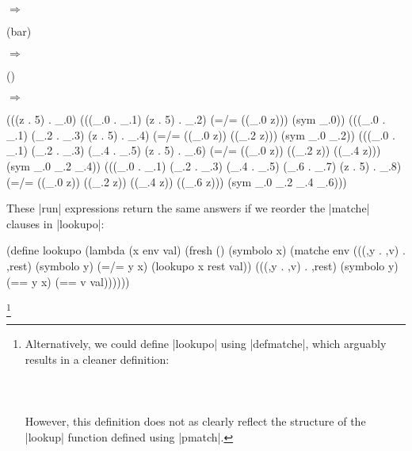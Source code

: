 \noindent{} $\Rightarrow$
\begin{schemeresponsebox}(bar)\end{schemeresponsebox}

\noindent{} $\Rightarrow$
\begin{schemeresponsebox}()\end{schemeresponsebox}

\noindent{}

$\Rightarrow$

\begin{schemeresponsebox}
(((z . 5) . _.0)
 (((_.0 . _.1) (z . 5) . _.2)
  (=/= ((_.0 z))) (sym _.0))
 (((_.0 . _.1) (_.2 . _.3) (z . 5) . _.4)
  (=/= ((_.0 z)) ((_.2 z))) (sym _.0 _.2))
 (((_.0 . _.1) (_.2 . _.3) (_.4 . _.5) (z . 5) . _.6)
  (=/= ((_.0 z)) ((_.2 z)) ((_.4 z))) (sym _.0 _.2 _.4))
 (((_.0 . _.1) (_.2 . _.3) (_.4 . _.5) (_.6 . _.7) (z . 5) . _.8)
  (=/= ((_.0 z)) ((_.2 z)) ((_.4 z)) ((_.6 z))) (sym _.0 _.2 _.4 _.6)))
\end{schemeresponsebox}

These \scheme|run| expressions return the same answers if we reorder the \scheme|matche| clauses in \scheme|lookupo|:

\begin{schemedisplay}
(define lookupo
  (lambda (x env val)
    (fresh ()
      (symbolo x)
      (matche env
        (((,y . ,v) . ,rest) (symbolo y)
         (=/= y x) (lookupo x rest val))
        (((,y . ,v) . ,rest) (symbolo y)
         (== y x) (== v val))))))
\end{schemedisplay}




\setbox\boxa{}

\footnote{Alternatively, we could define \scheme|lookupo| using \scheme|defmatche|, which arguably results in a cleaner definition: \\ \ \\ \usebox{\boxa} \\ \ \\ However, this definition does not as clearly reflect the structure of the \scheme|lookup| function defined using \scheme|pmatch|.}
